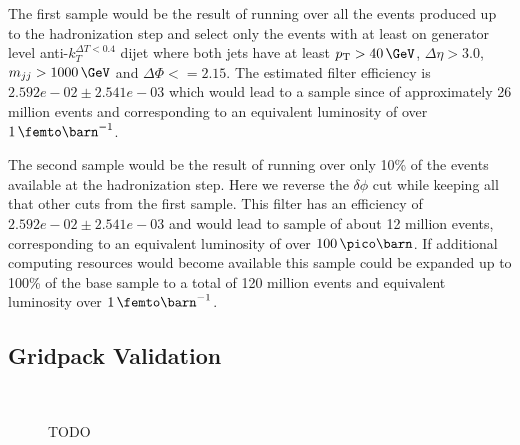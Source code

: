 The first sample would be the result of running over all the events produced up to the hadronization step and select only the events with at least on generator level anti-$k_T^{\Delta T < 0.4}$ dijet where both jets have at least $\pt > 40\,\GeV$, $\Delta\eta > 3.0$, $m_{jj} > 1000\,\GeV$ and $\Delta\Phi<=2.15$. The estimated filter efficiency is $2.592e-02 \pm 2.541e-03$
which would lead to a sample since of approximately 26 million events and corresponding to an equivalent luminosity of over $1\,\femto\barn^{-1}$.

The second sample would be the result of running over only 10\% of the events available at the hadronization step. Here we reverse the $\delta\phi$ cut while keeping all that other cuts from the first sample. This filter has an efficiency of $2.592e-02 \pm 2.541e-03$  and would lead to sample of about 12 million events, corresponding to an equivalent luminosity of over $100\,\pico\barn$. If additional computing resources would become available this sample could be expanded up to 100\% of the base sample to a total of 120 million events and equivalent luminosity over $1\,\femto\barn^{-1}$.

\subsection{Gridpack Validation}
\label{SUBSECTION:GridpackValidation}

% 
% 
% 





\begin{figure}[htp]%
\centering
{}\qquad
{}\\
\caption[TODO]{TODO}
\label{FIGURE:TODO}
\end{figure}

